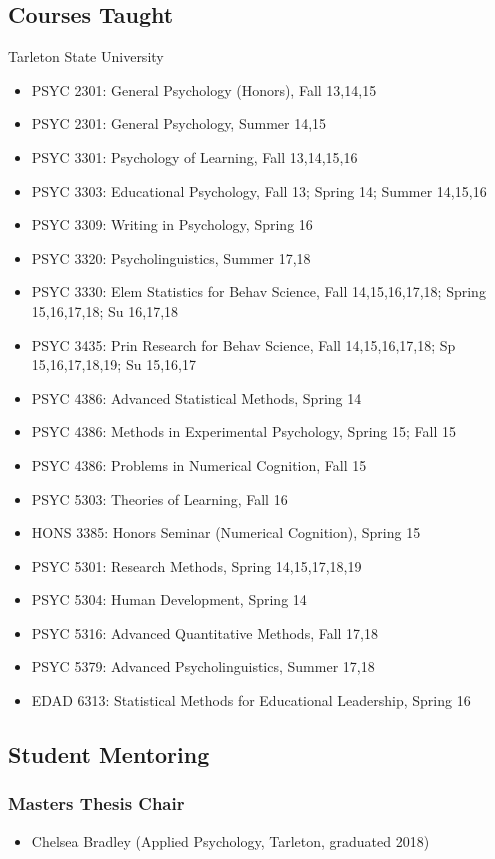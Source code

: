 \documentclass[article,10pt]{article}
\begin{document}
\subsection*{Courses Taught}
\label{sec:org4d55749}

Tarleton State University

\begin{itemize}
\item PSYC 2301: General Psychology (Honors), Fall 13,14,15
\item PSYC 2301: General Psychology, Summer 14,15
\item PSYC 3301: Psychology of Learning, Fall 13,14,15,16
\item PSYC 3303: Educational Psychology, Fall 13; Spring 14; Summer 14,15,16
\item PSYC 3309: Writing in Psychology, Spring 16
\item PSYC 3320: Psycholinguistics, Summer 17,18
\item PSYC 3330: Elem Statistics for Behav Science, Fall 14,15,16,17,18; Spring 15,16,17,18; Su 16,17,18
\item PSYC 3435: Prin Research for Behav Science, Fall 14,15,16,17,18; Sp 15,16,17,18,19; Su 15,16,17
\item PSYC 4386: Advanced Statistical Methods, Spring 14
\item PSYC 4386: Methods in Experimental Psychology, Spring 15; Fall 15
\item PSYC 4386: Problems in Numerical Cognition, Fall 15
\item PSYC 5303: Theories of Learning, Fall 16
\item HONS 3385: Honors Seminar (Numerical Cognition), Spring 15
\item PSYC 5301: Research Methods, Spring 14,15,17,18,19
\item PSYC 5304: Human Development, Spring 14
\item PSYC 5316: Advanced Quantitative Methods, Fall 17,18
\item PSYC 5379: Advanced Psycholinguistics, Summer 17,18
\item EDAD 6313: Statistical Methods for Educational Leadership, Spring 16
\end{itemize}

\subsection*{Student Mentoring}
\label{sec:orgd4d8672}

\subsubsection*{Masters Thesis Chair}
\label{sec:org22f28e1}
\begin{itemize}
\item Chelsea Bradley (Applied Psychology, Tarleton, graduated 2018)
\end{itemize}
\end{document}
